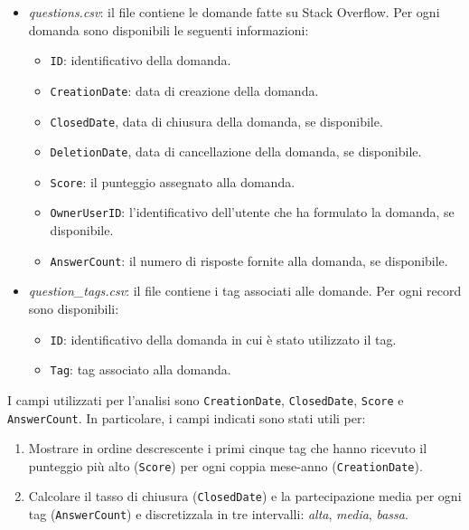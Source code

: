 \documentclass[10pt]{article}
\begin{document}
\begin{itemize}
    \item \textit{questions.csv}: il file contiene le domande fatte su Stack Overflow. Per ogni domanda sono disponibili le seguenti informazioni:
    \begin{itemize}
        \item \texttt{ID}: identificativo della domanda.
        \item \texttt{CreationDate}: data di creazione della domanda.
        \item \texttt{ClosedDate}, data di chiusura della domanda, se disponibile.
        \item \texttt{DeletionDate}, data di cancellazione della domanda, se disponibile.
        \item \texttt{Score}: il punteggio assegnato alla domanda.
        \item \texttt{OwnerUserID}: l'identificativo dell'utente che ha formulato la domanda, se disponibile.
        \item \texttt{AnswerCount}: il numero di risposte fornite alla domanda, se disponibile.
    \end{itemize}
    \item \textit{question\_tags.csv}: il file contiene i tag associati alle domande. Per ogni record sono disponibili:
    \begin{itemize}
        \item \texttt{ID}: identificativo della domanda in cui è stato utilizzato il tag.
        \item \texttt{Tag}: tag associato alla domanda.
    \end{itemize}
\end{itemize}

I campi utilizzati per l'analisi sono \texttt{CreationDate}, \texttt{ClosedDate},  \texttt{Score} e \texttt{AnswerCount}.
%
In particolare, i campi indicati sono stati utili per:

\begin{enumerate}
%
    \item Mostrare in ordine descrescente i primi cinque tag che hanno ricevuto il punteggio più alto (\texttt{Score}) per ogni coppia mese-anno (\texttt{CreationDate}).
%
    \item Calcolare il tasso di chiusura (\texttt{ClosedDate}) e la partecipazione media per ogni tag (\texttt{AnswerCount}) e discretizzala in tre intervalli: \textit{alta}, \textit{media}, \textit{bassa}.
%
\end{enumerate}
\end{document}
